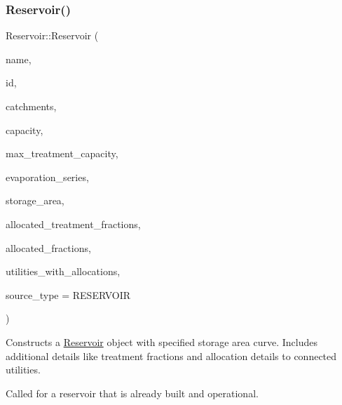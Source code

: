 \subsubsection{\texorpdfstring{Reservoir()}{Reservoir()}\hspace{0.1cm}{\footnotesize\ttfamily [6/9]}}
{\footnotesize\ttfamily Reservoir\+::\+Reservoir (\begin{DoxyParamCaption}\item[{const char $\ast$}]{name,  }\item[{const int}]{id,  }\item[{const vector$<$ \mbox{\hyperlink{classCatchment}{Catchment}} $\ast$$>$ \&}]{catchments,  }\item[{const double}]{capacity,  }\item[{const double}]{max\+\_\+treatment\+\_\+capacity,  }\item[{\mbox{\hyperlink{classEvaporationSeries}{Evaporation\+Series}} \&}]{evaporation\+\_\+series,  }\item[{double}]{storage\+\_\+area,  }\item[{vector$<$ double $>$ $\ast$}]{allocated\+\_\+treatment\+\_\+fractions,  }\item[{vector$<$ double $>$ $\ast$}]{allocated\+\_\+fractions,  }\item[{vector$<$ int $>$ $\ast$}]{utilities\+\_\+with\+\_\+allocations,  }\item[{int}]{source\+\_\+type = {\ttfamily RESERVOIR} }\end{DoxyParamCaption})}



Constructs a \mbox{\hyperlink{classReservoir}{Reservoir}} object with specified storage area curve. Includes additional details like treatment fractions and allocation details to connected utilities. 

Called for a reservoir that is already built and operational.


